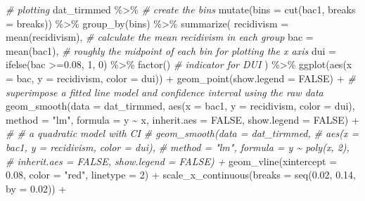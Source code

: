 \documentclass[
  11pt,
]{article}
\newenvironment{Shaded}{\begin{snugshade}}{\end{snugshade}}
\newcommand{\AttributeTok}[1]{\textcolor[rgb]{0.77,0.63,0.00}{#1}}
\newcommand{\CommentTok}[1]{\textcolor[rgb]{0.56,0.35,0.01}{\textit{#1}}}
\newcommand{\ConstantTok}[1]{\textcolor[rgb]{0.00,0.00,0.00}{#1}}
\newcommand{\DecValTok}[1]{\textcolor[rgb]{0.00,0.00,0.81}{#1}}
\newcommand{\FloatTok}[1]{\textcolor[rgb]{0.00,0.00,0.81}{#1}}
\newcommand{\FunctionTok}[1]{\textcolor[rgb]{0.00,0.00,0.00}{#1}}
\newcommand{\NormalTok}[1]{#1}
\newcommand{\SpecialCharTok}[1]{\textcolor[rgb]{0.00,0.00,0.00}{#1}}
\newcommand{\StringTok}[1]{\textcolor[rgb]{0.31,0.60,0.02}{#1}}
\begin{document}
\begin{Shaded}
\begin{Highlighting}[]
\CommentTok{\# plotting}
\NormalTok{dat\_tirmmed }\SpecialCharTok{\%\textgreater{}\%} 
  \CommentTok{\# create the bins}
  \FunctionTok{mutate}\NormalTok{(}\AttributeTok{bins =} \FunctionTok{cut}\NormalTok{(bac1, }\AttributeTok{breaks =}\NormalTok{ breaks)) }\SpecialCharTok{\%\textgreater{}\%} 
  \FunctionTok{group\_by}\NormalTok{(bins) }\SpecialCharTok{\%\textgreater{}\%} 
  \FunctionTok{summarize}\NormalTok{(}
    \AttributeTok{recidivism =} \FunctionTok{mean}\NormalTok{(recidivism), }\CommentTok{\# calculate the mean recidivism in each group}
    \AttributeTok{bac =} \FunctionTok{mean}\NormalTok{(bac1), }\CommentTok{\# roughly the midpoint of each bin for plotting the x axis}
    \AttributeTok{dui =} \FunctionTok{ifelse}\NormalTok{(bac }\SpecialCharTok{\textgreater{}=}\FloatTok{0.08}\NormalTok{, }\DecValTok{1}\NormalTok{, }\DecValTok{0}\NormalTok{) }\SpecialCharTok{\%\textgreater{}\%} \FunctionTok{factor}\NormalTok{() }\CommentTok{\# indicator for DUI}
\NormalTok{  ) }\SpecialCharTok{\%\textgreater{}\%} 
  \FunctionTok{ggplot}\NormalTok{(}\FunctionTok{aes}\NormalTok{(}\AttributeTok{x =}\NormalTok{ bac, }\AttributeTok{y =}\NormalTok{ recidivism, }\AttributeTok{color =}\NormalTok{ dui)) }\SpecialCharTok{+}
  \FunctionTok{geom\_point}\NormalTok{(}\AttributeTok{show.legend =} \ConstantTok{FALSE}\NormalTok{) }\SpecialCharTok{+}
  \CommentTok{\# superimpose a fitted line model and confidence interval using the raw data}
  \FunctionTok{geom\_smooth}\NormalTok{(}\AttributeTok{data =}\NormalTok{ dat\_tirmmed,}
              \FunctionTok{aes}\NormalTok{(}\AttributeTok{x =}\NormalTok{ bac1, }\AttributeTok{y =}\NormalTok{ recidivism, }\AttributeTok{color =}\NormalTok{ dui),}
              \AttributeTok{method =} \StringTok{"lm"}\NormalTok{, }\AttributeTok{formula =}\NormalTok{ y }\SpecialCharTok{\textasciitilde{}}\NormalTok{ x,}
              \AttributeTok{inherit.aes =} \ConstantTok{FALSE}\NormalTok{, }\AttributeTok{show.legend =} \ConstantTok{FALSE}\NormalTok{) }\SpecialCharTok{+}
  \CommentTok{\# \# a quadratic model with CI}
  \CommentTok{\# geom\_smooth(data = dat\_tirmmed,}
  \CommentTok{\#             aes(x = bac1, y = recidivism, color = dui),}
  \CommentTok{\#             method = "lm", formula = y \textasciitilde{} poly(x, 2),}
  \CommentTok{\#             inherit.aes = FALSE, show.legend = FALSE) +}
  \FunctionTok{geom\_vline}\NormalTok{(}\AttributeTok{xintercept =} \FloatTok{0.08}\NormalTok{, }\AttributeTok{color =} \StringTok{"red"}\NormalTok{, }\AttributeTok{linetype =} \DecValTok{2}\NormalTok{) }\SpecialCharTok{+}
  \FunctionTok{scale\_x\_continuous}\NormalTok{(}\AttributeTok{breaks =} \FunctionTok{seq}\NormalTok{(}\FloatTok{0.02}\NormalTok{, }\FloatTok{0.14}\NormalTok{, }\AttributeTok{by =} \FloatTok{0.02}\NormalTok{)) }\SpecialCharTok{+}

\end{Highlighting}
\end{Shaded}
\end{document}

